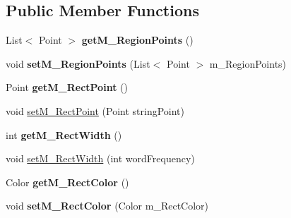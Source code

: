\subsection*{Public Member Functions}
\begin{DoxyCompactItemize}
\item 
\mbox{\label{classtranslation_visualization_1_1_rectangle_a1f4b83add847f1475ce0cbcfa3410250}} 
List$<$ Point $>$ {\bfseries get\+M\+\_\+\+Region\+Points} ()
\item 
\mbox{\label{classtranslation_visualization_1_1_rectangle_a2908d8305e4e4470dc70fb3131d0b3e0}} 
void {\bfseries set\+M\+\_\+\+Region\+Points} (List$<$ Point $>$ m\+\_\+\+Region\+Points)
\item 
\mbox{\label{classtranslation_visualization_1_1_rectangle_a775207b4d328af2eea2b08c367eded8a}} 
Point {\bfseries get\+M\+\_\+\+Rect\+Point} ()
\item 
void \hyperlink{classtranslation_visualization_1_1_rectangle_a7f86b7e90bb52bb39d18e4f39ff29f6f}{set\+M\+\_\+\+Rect\+Point} (Point string\+Point)
\item 
\mbox{\label{classtranslation_visualization_1_1_rectangle_aaa4f1b231cf0411d5c0257ee04a2b6cc}} 
int {\bfseries get\+M\+\_\+\+Rect\+Width} ()
\item 
void \hyperlink{classtranslation_visualization_1_1_rectangle_ab6bedb4ab9dc6e6a6baf8e4b0685dd67}{set\+M\+\_\+\+Rect\+Width} (int word\+Frequency)
\item 
\mbox{\label{classtranslation_visualization_1_1_rectangle_afec0d7bb7a4db7a5f31faab44f4c1983}} 
Color {\bfseries get\+M\+\_\+\+Rect\+Color} ()
\item 
\mbox{\label{classtranslation_visualization_1_1_rectangle_a05d272d32a0825b6e5e2cac52f4ea0ea}} 
void {\bfseries set\+M\+\_\+\+Rect\+Color} (Color m\+\_\+\+Rect\+Color)
\item 
\mbox{\label{classtranslation_visualization_1_1_rectangle_ab74ebe8a3d1b79adaf0bde29eb9be11a}} 

\end{DoxyCompactItemize}
